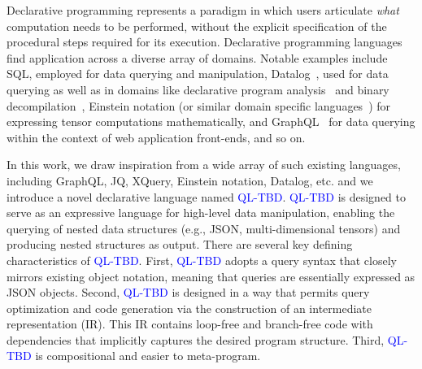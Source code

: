 \documentclass[runningheads]{llncs}
\newcommand{\lang}{\textcolor{blue}{QL-TBD}}
\begin{document}
Declarative programming represents a paradigm in which users articulate \emph{what}
computation needs to be performed, without the explicit specification of the
procedural steps required for its execution.
Declarative programming languages find application across a diverse array of
domains.
Notable examples include SQL, employed for data querying and manipulation,
Datalog~\cite{datalog}, used for data querying as well as in domains like
declarative program analysis~\cite{proganalysis_first, logic_proganalysis, souffle_cav}
and binary decompilation~\cite{ddissam}, Einstein notation (or similar domain
specific languages~\cite{tensor_comprehensions}) for expressing tensor computations
mathematically, and GraphQL~\cite{graphql} for data querying within the context of web application
front-ends, and so on.

In this work, we draw inspiration from a wide array of such existing languages,
including GraphQL, JQ, XQuery, Einstein notation, Datalog, etc. and 
we introduce a novel declarative language named \lang{}.
\lang{} is designed to serve as an expressive language for high-level data
manipulation, enabling the querying of nested data structures
(e.g., JSON, multi-dimensional tensors)
and producing nested structures as output.
There are several key defining characteristics of \lang{}.
First, \lang{} adopts a query syntax that closely mirrors existing object notation,
meaning that queries are essentially expressed as JSON objects.
Second, \lang{} is designed in a way that permits query optimization and
code generation via the construction of an intermediate representation (IR).
This IR contains loop-free and branch-free code with dependencies that implicitly
captures the desired program structure.
Third, \lang{} is compositional and easier to meta-program.

\end{document}
